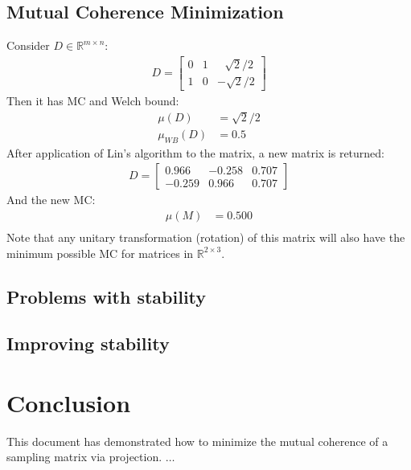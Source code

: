 \documentclass[journal]{IEEEtran}
\begin{document}
\subsection{Mutual Coherence Minimization}
Consider $D \in \mathbb{R}^{m\times n}$:
\begin{align}
    D = \begin{bmatrix} 0 &1 &\>\>\>\sqrt{2}/2 \\
                        1 &0 &-\sqrt{2}/2 \end{bmatrix}
\end{align}
Then it has MC and Welch bound:
\begin{align}
\mu (D) &= \sqrt{2}/2 \\
\mu_{WB} (D) &= 0.5
\end{align}
After application of Lin's algorithm to the matrix, a new matrix is returned:
\begin{align}
    D = \left[\begin{array}{ccc} 0.966 & -0.258  &0.707\\ -0.259 & 0.966 & 0.707 \end{array}\right] 
\end{align}
And the new MC:
\begin{align}
\mu (M) &= 0.500 \\[1em]
\end{align}
Note that any unitary transformation (rotation) of this matrix will also have the minimum possible MC for
matrices in $\mathbb{R}^{2 \times 3}$.
\subsection{Problems with stability}

\subsection{Improving stability}

\section{Conclusion}
This document has demonstrated how to minimize the mutual coherence of a sampling
matrix via projection. $\ldots$
\end{document}
